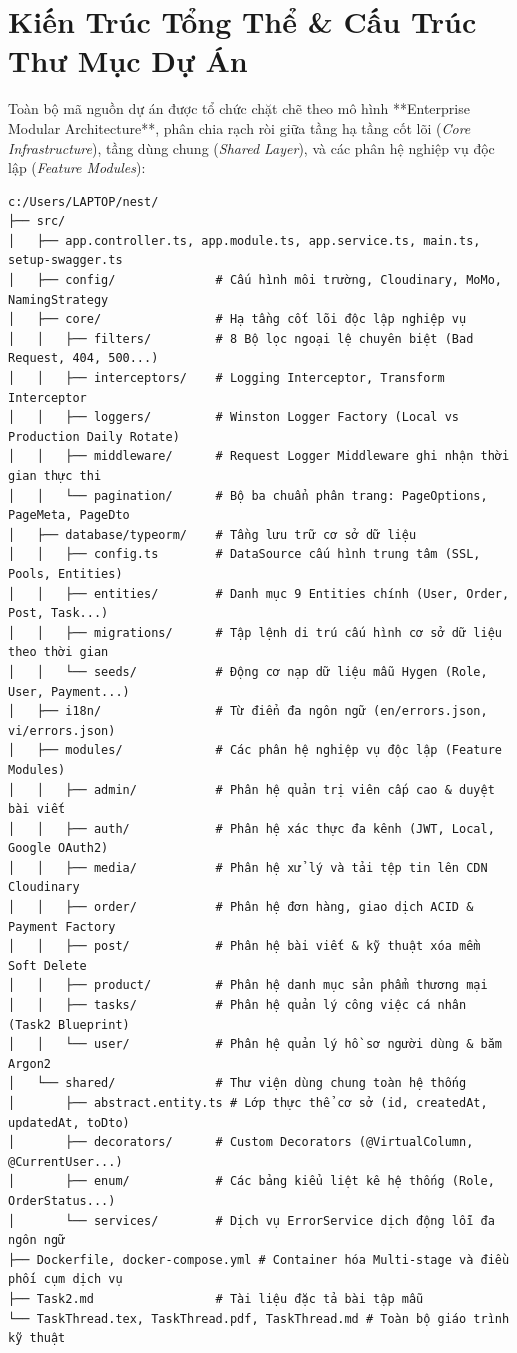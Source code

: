 \documentclass[12pt,a4paper,oneside]{book}
\begin{document}
\section{Kiến Trúc Tổng Thể \& Cấu Trúc Thư Mục Dự Án}
Toàn bộ mã nguồn dự án được tổ chức chặt chẽ theo mô hình **Enterprise Modular Architecture**, phân chia rạch ròi giữa tầng hạ tầng cốt lõi (\textit{Core Infrastructure}), tầng dùng chung (\textit{Shared Layer}), và các phân hệ nghiệp vụ độc lập (\textit{Feature Modules}):

\begin{codebox}
\begin{Verbatim}[fontsize=\small]
c:/Users/LAPTOP/nest/
├── src/
│   ├── app.controller.ts, app.module.ts, app.service.ts, main.ts, setup-swagger.ts
│   ├── config/              # Cấu hình môi trường, Cloudinary, MoMo, NamingStrategy
│   ├── core/                # Hạ tầng cốt lõi độc lập nghiệp vụ
│   │   ├── filters/         # 8 Bộ lọc ngoại lệ chuyên biệt (Bad Request, 404, 500...)
│   │   ├── interceptors/    # Logging Interceptor, Transform Interceptor
│   │   ├── loggers/         # Winston Logger Factory (Local vs Production Daily Rotate)
│   │   ├── middleware/      # Request Logger Middleware ghi nhận thời gian thực thi
│   │   └── pagination/      # Bộ ba chuẩn phân trang: PageOptions, PageMeta, PageDto
│   ├── database/typeorm/    # Tầng lưu trữ cơ sở dữ liệu
│   │   ├── config.ts        # DataSource cấu hình trung tâm (SSL, Pools, Entities)
│   │   ├── entities/        # Danh mục 9 Entities chính (User, Order, Post, Task...)
│   │   ├── migrations/      # Tập lệnh di trú cấu hình cơ sở dữ liệu theo thời gian
│   │   └── seeds/           # Động cơ nạp dữ liệu mẫu Hygen (Role, User, Payment...)
│   ├── i18n/                # Từ điển đa ngôn ngữ (en/errors.json, vi/errors.json)
│   ├── modules/             # Các phân hệ nghiệp vụ độc lập (Feature Modules)
│   │   ├── admin/           # Phân hệ quản trị viên cấp cao & duyệt bài viết
│   │   ├── auth/            # Phân hệ xác thực đa kênh (JWT, Local, Google OAuth2)
│   │   ├── media/           # Phân hệ xử lý và tải tệp tin lên CDN Cloudinary
│   │   ├── order/           # Phân hệ đơn hàng, giao dịch ACID & Payment Factory
│   │   ├── post/            # Phân hệ bài viết & kỹ thuật xóa mềm Soft Delete
│   │   ├── product/         # Phân hệ danh mục sản phẩm thương mại
│   │   ├── tasks/           # Phân hệ quản lý công việc cá nhân (Task2 Blueprint)
│   │   └── user/            # Phân hệ quản lý hồ sơ người dùng & băm Argon2
│   └── shared/              # Thư viện dùng chung toàn hệ thống
│       ├── abstract.entity.ts # Lớp thực thể cơ sở (id, createdAt, updatedAt, toDto)
│       ├── decorators/      # Custom Decorators (@VirtualColumn, @CurrentUser...)
│       ├── enum/            # Các bảng kiểu liệt kê hệ thống (Role, OrderStatus...)
│       └── services/        # Dịch vụ ErrorService dịch động lỗi đa ngôn ngữ
├── Dockerfile, docker-compose.yml # Container hóa Multi-stage và điều phối cụm dịch vụ
├── Task2.md                 # Tài liệu đặc tả bài tập mẫu
└── TaskThread.tex, TaskThread.pdf, TaskThread.md # Toàn bộ giáo trình kỹ thuật
\end{Verbatim}
\end{codebox}
\end{document}
